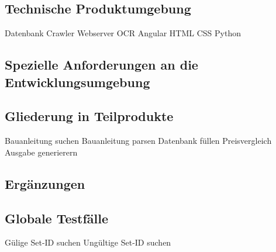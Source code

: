 \subsection{Technische Produktumgebung}
Datenbank \newline
Crawler \newline
Webserver \newline
OCR \newline
Angular \newline
HTML \newline
CSS \newline
Python \newline

\subsection{Spezielle Anforderungen an die Entwicklungsumgebung}

\subsection{Gliederung in Teilprodukte}
Bauanleitung suchen \newline
Bauanleitung parsen \newline
Datenbank füllen \newline
Preisvergleich \newline
Ausgabe generierern \newline

\subsection{Ergänzungen}

\subsection{Globale Testfälle}
Gülige Set-ID suchen \newline
Ungültige Set-ID suchen \newline
